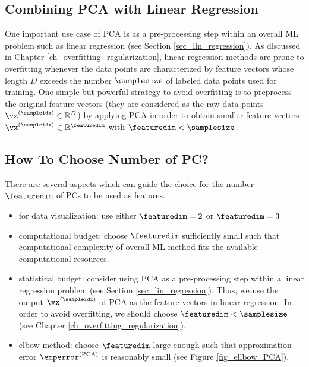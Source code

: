 \documentclass[12pt]{report}
\begin{document}
\subsection{Combining PCA with Linear Regression} 

One important use case of PCA is as a pre-processing step within an overall ML problem 
such as linear regression (see Section \ref{sec_lin_regression}). As discussed in Chapter 
\ref{ch_overfitting_regularization}, linear regression methods are prone to overfitting 
whenever the data points are characterized by feature vectors whose length $D$ exceeds 
the number $\samplesize$ of labeled data points used for training. One simple but powerful 
strategy to avoid overfitting is to preprocess the original feature vectors (they are considered 
as the raw data points $\vz^{(\sampleidx)}\in \mathbb{R}^{D}$) by applying PCA in order to obtain 
smaller feature vectors $\vx^{(\sampleidx)} \in \mathbb{R}^{\featuredim}$ with $\featuredim < \samplesize$. 



\subsection{How To Choose Number of PC?} 
There are several aspects which can guide the choice for the number $\featuredim$ of PCs to be used as features. 
\begin{itemize}
\item for data visualization: use either $\featuredim=2$ or $\featuredim=3$ 
\item computational budget: choose $\featuredim$ sufficiently small such that computational complexity of overall 
ML method fits the available computational resources.  
\item statistical budget: consider using PCA as a pre-processing step within a linear 
regression problem (see Section \ref{sec_lin_regression}). Thus, we use the output 
$\vx^{(\sampleidx)}$ of PCA as the feature vectors in linear regression. In order to avoid 
overfitting, we should choose $\featuredim < \samplesize$ (see Chapter \ref{ch_overfitting_regularization}). 
\item elbow method: choose $\featuredim$ large enough such that approximation 
error $\emperror^{(\rm PCA)}$ is reasonably small (see Figure \ref{fig_ellbow_PCA}). 
\end{itemize} 
\end{document}
